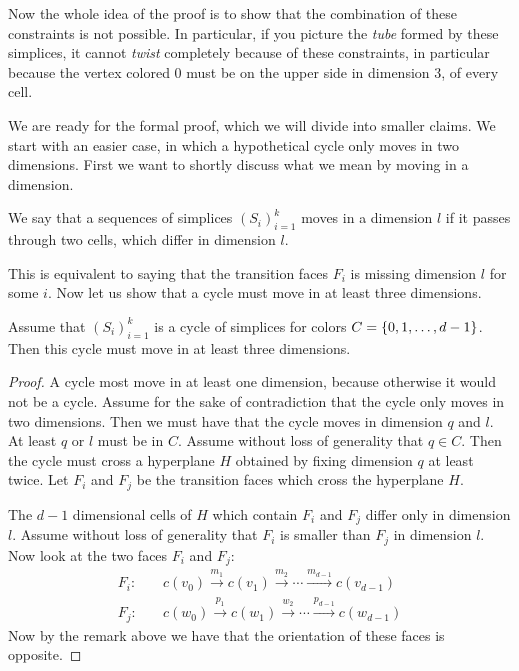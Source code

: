 Now the whole idea of the proof is to show that the combination of these constraints is not possible. In particular, if you picture the \emph{tube} formed by these simplices, it cannot \emph{twist} completely because of these constraints, in particular because the vertex colored $0$ must be on the upper side in dimension 3, of every cell.

We are ready for the formal proof, which we will divide into smaller claims. We start with an easier case, in which a hypothetical cycle only moves in two dimensions. First we want to shortly discuss what we mean by moving in a dimension.

\begin{definition}
	We say that a sequences of simplices ${\left(S_i\right)}_{i=1}^k$ moves in a dimension $l$ if it passes through two cells, which differ in dimension $l$.
\end{definition}

This is equivalent to saying that the transition faces $F_i$ is missing dimension $l$ for some $i$. Now let us show that a cycle must move in at least three dimensions.

\begin{claim}\label{claim:no_simple_cycles}
	Assume that ${\left(S_i\right)}_{i=1}^k$ is a cycle of simplices for colors $C = \left\{0, 1, \dots, d-1\right\}$. Then this cycle must move in at least three dimensions.
\end{claim}
\begin{proof}
	A cycle most move in at least one dimension, because otherwise it would not be a cycle. Assume for the sake of contradiction that the cycle only moves in two dimensions. Then we must have that the cycle moves in dimension $q$ and $l$. At least $q$ or $l$ must be in $C$. Assume without loss of generality that $q \in C$. Then the cycle must cross a hyperplane $H$ obtained by fixing dimension $q$ at least twice. Let $F_i$ and $F_j$ be the transition faces which cross the hyperplane $H$.

	The $d-1$ dimensional cells of $H$ which contain $F_i$ and $F_j$ differ only in dimension $l$. Assume without loss of generality that $F_i$ is smaller than $F_j$ in dimension $l$. Now look at the two faces $F_i$ and $F_j$:
	\begin{align*}
		F_i: \quad & c(v_0) \xrightarrow{m_1} c(v_1) \xrightarrow{m_2}  \cdots \xrightarrow{m_{d-1}} c(v_{d-1}) \\
		F_j: \quad & c(w_0) \xrightarrow{p_1} c(w_1) \xrightarrow{w_2}  \cdots \xrightarrow{p_{d-1}} c(w_{d-1})
	\end{align*}
	Now by the remark above we have that the orientation of these faces is opposite.
\end{proof}



